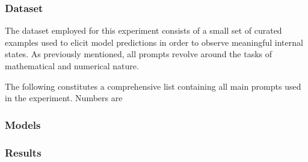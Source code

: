 \subsubsection{Dataset}

The dataset employed for this experiment consists of a small set of curated examples used to elicit model predictions in order to observe meaningful internal states.
As previously mentioned, all prompts revolve around the  tasks of mathematical and numerical nature.

The following constitutes a comprehensive list containing all main prompts used in the experiment.
Numbers are 



\subsubsection{Models}

\subsubsection{Results}

